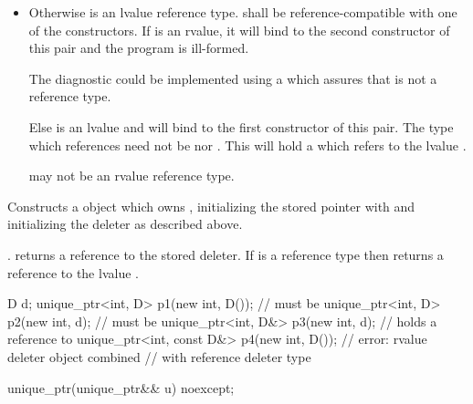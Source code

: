 \begin{itemdescr}
\begin{itemize}
\item Otherwise  is an lvalue reference type. 
shall be reference-compatible with one of the constructors. If  is
an rvalue, it will bind to the second constructor of this pair and the program is
ill-formed. \begin{note} The diagnostic could
be implemented using a  which assures that
 is not a reference type. \end{note} Else 
is an lvalue and will bind to the first constructor of this pair. The type
which  references need not be 
nor . This  will
hold a  which refers to the lvalue .
\begin{note}  may not be an rvalue reference type.
\end{note}
\end{itemize}

\pnum
\effects Constructs a  object which owns , initializing
the stored pointer with  and initializing the deleter as described above.

\pnum
\postconditions {}.
 returns a reference to the stored
deleter. If  is a reference type then 
returns a reference to the lvalue .

\begin{example}

\begin{codeblock}
D d;
unique_ptr<int, D> p1(new int, D());        //  must be 
unique_ptr<int, D> p2(new int, d);          //  must be 
unique_ptr<int, D&> p3(new int, d);         //  holds a reference to 
unique_ptr<int, const D&> p4(new int, D()); // error: rvalue deleter object combined
                                            // with reference deleter type
\end{codeblock}

\end{example}

\end{itemdescr}

%
\begin{itemdecl}
unique_ptr(unique_ptr&& u) noexcept;
\end{itemdecl}

